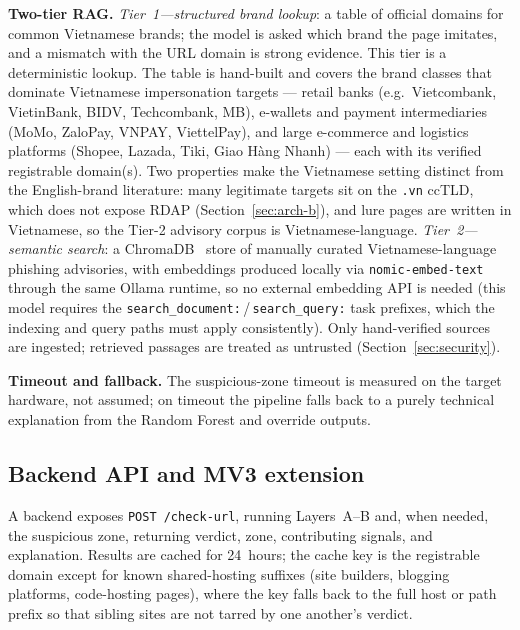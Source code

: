 \documentclass[conference]{IEEEtran}
\begin{document}
\textbf{Two-tier RAG.} \emph{Tier~1---structured brand lookup}: a table of
official domains for common Vietnamese brands; the model is asked which brand the
page imitates, and a mismatch with the URL domain is strong evidence. This tier
is a deterministic lookup. The table is hand-built and covers the brand classes
that dominate Vietnamese impersonation targets --- retail banks (e.g.\
Vietcombank, VietinBank, BIDV, Techcombank, MB), e-wallets and payment
intermediaries (MoMo, ZaloPay, VNPAY, ViettelPay), and large e-commerce and
logistics platforms (Shopee, Lazada, Tiki, Giao H\`ang Nhanh) --- each with its
verified registrable domain(s). Two properties make the Vietnamese setting
distinct from the English-brand literature: many legitimate targets sit on the
\texttt{.vn} ccTLD, which does not expose RDAP (Section~\ref{sec:arch-b}), and
lure pages are written in Vietnamese, so the Tier-2 advisory corpus is
Vietnamese-language. \emph{Tier~2---semantic search}: a
ChromaDB~\cite{chromadb} store of manually curated Vietnamese-language phishing
advisories, with embeddings produced locally via
\texttt{nomic-embed-text}~\cite{nussbaum2024nomic} through the same Ollama
runtime, so no external embedding API is needed (this model requires the
\texttt{search\_document:}\,/\,\texttt{search\_query:} task prefixes, which the
indexing and query paths must apply consistently). Only hand-verified sources are
ingested; retrieved passages are treated as untrusted (Section~\ref{sec:security}).

\textbf{Timeout and fallback.} The suspicious-zone timeout is measured on the
target hardware, not assumed; on timeout the pipeline falls back to a purely
technical explanation from the Random Forest and override outputs.

\subsection{Backend API and MV3 extension}
\label{sec:arch-e}
A backend exposes \texttt{POST /check-url}, running Layers~A--B and, when needed,
the suspicious zone, returning verdict, zone, contributing signals, and
explanation. Results are cached for 24~hours; the cache key is the registrable
domain except for known shared-hosting suffixes (site builders, blogging
platforms, code-hosting pages), where the key falls back to the full host or path
prefix so that sibling sites are not tarred by one another's verdict.
\end{document}
